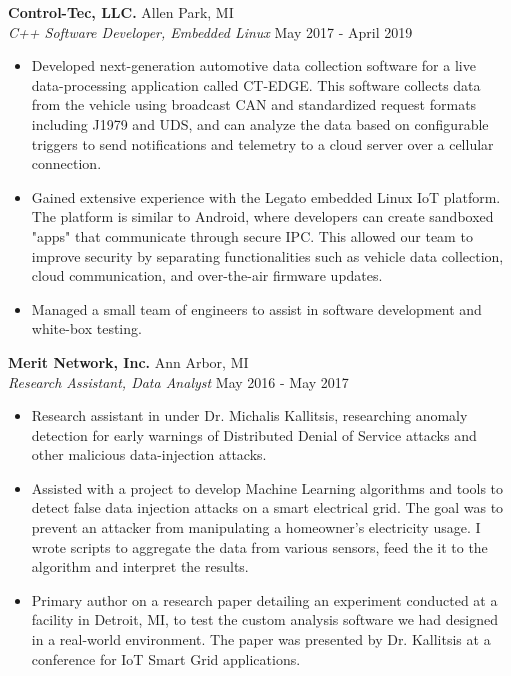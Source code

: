 \documentclass[margin,11pt]{res}
\begin{document}
\begin{resume}
\vspace{-10pt}
\textbf{Control-Tec, LLC.} \hfill Allen Park, MI\\
\textsl{C++ Software Developer, Embedded Linux} \hfill May 2017 - April 2019
\begin{itemize}
    \itemsep -2pt
    \item Developed next-generation automotive data collection software for a
          live data-processing application called CT-EDGE. This software
          collects data from the vehicle using broadcast CAN and standardized
          request formats including J1979 and UDS, and can analyze the data
          based on configurable triggers to send notifications and telemetry
          to a cloud server over a cellular connection.
    \item Gained extensive experience with the Legato embedded Linux IoT
          platform. The platform is similar to Android, where developers
          can create sandboxed "apps" that communicate through secure IPC.
          This allowed our team to improve security by separating
          functionalities such as vehicle data collection, cloud communication,
          and over-the-air firmware updates.
    \item Managed a small team of engineers to assist in software development
          and white-box testing.
\end{itemize}

\vspace{-10pt}
\textbf{Merit Network, Inc.} \hfill Ann Arbor, MI\\
\textsl{Research Assistant, Data Analyst} \hfill May 2016 - May 2017
\begin{itemize}
    \itemsep -2pt
    \item Research assistant in under Dr. Michalis Kallitsis, researching anomaly
          detection for early warnings of Distributed Denial of Service attacks
          and other malicious data-injection attacks.
    \item Assisted with a project to develop Machine Learning algorithms and
          tools to detect false data injection attacks on a smart electrical
          grid. The goal was to prevent an attacker from manipulating a
          homeowner's electricity usage. I wrote scripts to aggregate the data
          from various sensors, feed the it to the algorithm and interpret the
          results.
    \item Primary author on a research paper detailing an experiment conducted
          at a facility in Detroit, MI, to test the custom analysis software
          we had designed in a real-world environment. The paper was presented
          by Dr. Kallitsis at a conference for IoT Smart Grid applications.
\end{itemize}


\end{resume}
\end{document}
